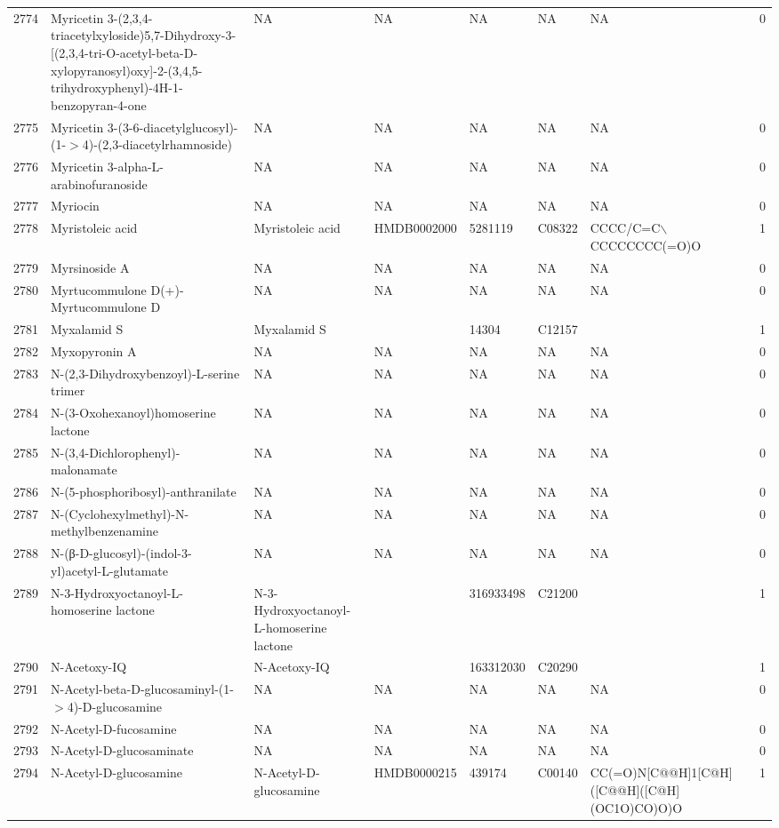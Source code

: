 \documentclass[a4paper]{article}
\begin{document}
\begin{longtable}{rlllllll}
  2774 & Myricetin 3-(2,3,4-triacetylxyloside)5,7-Dihydroxy-3-[(2,3,4-tri-O-acetyl-beta-D-xylopyranosyl)oxy]-2-(3,4,5-trihydroxyphenyl)-4H-1-benzopyran-4-one & NA & NA & NA & NA & NA & 0 \\ 
  2775 & Myricetin 3-(3-6-diacetylglucosyl)-(1-$>$4)-(2,3-diacetylrhamnoside) & NA & NA & NA & NA & NA & 0 \\ 
  2776 & Myricetin 3-alpha-L-arabinofuranoside & NA & NA & NA & NA & NA & 0 \\ 
  2777 & Myriocin & NA & NA & NA & NA & NA & 0 \\ 
  2778 & Myristoleic acid & Myristoleic acid & HMDB0002000 & 5281119 & C08322 & CCCC/C=C$\backslash$CCCCCCCC(=O)O & 1 \\ 
  2779 & Myrsinoside A & NA & NA & NA & NA & NA & 0 \\ 
  2780 & Myrtucommulone D(+)-Myrtucommulone D & NA & NA & NA & NA & NA & 0 \\ 
  2781 & Myxalamid S & Myxalamid S &  & 14304 & C12157 &  & 1 \\ 
  2782 & Myxopyronin A & NA & NA & NA & NA & NA & 0 \\ 
  2783 & N-(2,3-Dihydroxybenzoyl)-L-serine trimer & NA & NA & NA & NA & NA & 0 \\ 
  2784 & N-(3-Oxohexanoyl)homoserine lactone & NA & NA & NA & NA & NA & 0 \\ 
  2785 & N-(3,4-Dichlorophenyl)-malonamate & NA & NA & NA & NA & NA & 0 \\ 
  2786 & N-(5-phosphoribosyl)-anthranilate & NA & NA & NA & NA & NA & 0 \\ 
  2787 & N-(Cyclohexylmethyl)-N-methylbenzenamine & NA & NA & NA & NA & NA & 0 \\ 
  2788 & N-(β-D-glucosyl)-(indol-3-yl)acetyl-L-glutamate & NA & NA & NA & NA & NA & 0 \\ 
  2789 & N-3-Hydroxyoctanoyl-L-homoserine lactone & N-3-Hydroxyoctanoyl-L-homoserine lactone &  & 316933498 & C21200 &  & 1 \\ 
  2790 & N-Acetoxy-IQ & N-Acetoxy-IQ &  & 163312030 & C20290 &  & 1 \\ 
  2791 & N-Acetyl-beta-D-glucosaminyl-(1-$>$4)-D-glucosamine & NA & NA & NA & NA & NA & 0 \\ 
  2792 & N-Acetyl-D-fucosamine & NA & NA & NA & NA & NA & 0 \\ 
  2793 & N-Acetyl-D-glucosaminate & NA & NA & NA & NA & NA & 0 \\ 
  2794 & N-Acetyl-D-glucosamine & N-Acetyl-D-glucosamine & HMDB0000215 & 439174 & C00140 & CC(=O)N[C@@H]1[C@H]([C@@H]([C@H](OC1O)CO)O)O & 1 \\ 

\end{longtable}
\end{document}
